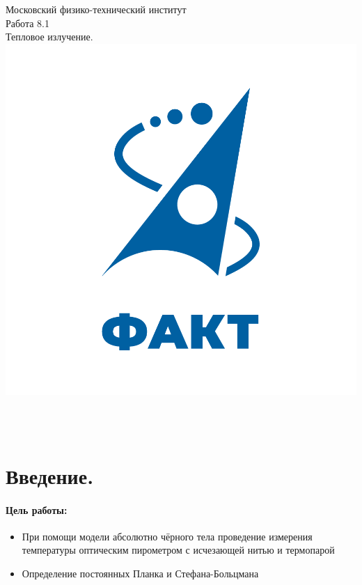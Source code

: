 \documentclass[a4paper,12pt]{article} %
\begin{document}

\begin{titlepage}
\begin{center}
	\large{Московский физико-технический институт}\\
	\vspace{100px}
	\LARGE{Работа 8.1}\\
	\LARGE{Тепловое излучение.}\\
	\vspace{30px}
	\includegraphics[scale = 0.3]{fakt_logo.png}\\
\end{center}

\vfill
\begin{flushright}
	\\
    \\
\end{flushright}
\end{titlepage}

\newpage

\section*{Введение.}
\paragraph*{Цель работы:} 
\begin{itemize}
    \item При помощи модели абсолютно чёрного тела проведение измерения температуры оптическим пирометром с исчезающей нитью и термопарой
    \item Определение постоянных Планка и Стефана-Больцмана
\end{itemize}
\end{document}
